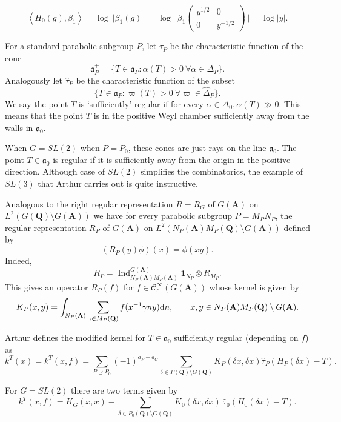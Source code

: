 \documentclass{ims9x6}
\def\apg{a_{P} - a_{G}}
\def\A{\mathbf A}
\def\Q{\mathbf Q}
\def\CCC{\mathcal C}
\def\aaa{\mathfrak a}
\def\d{\text d}
\def\bs{\setminus}
\def\Ind{\operatorname{Ind}}
\def\Ltwo{L^2}
\def\mod#1{\lvert #1 \rvert} %
\def\sprod#1#2{\left\langle #1 , #2 \right\rangle}  %
\begin{document}
\[ \sprod{H_0(g)}{\beta_1} = \log \ \mod{\beta_1(g)\ } = \log \ \mod{\beta_1 
			\begin{pmatrix} y^{1/2} & 0 \\ 0 & y^{-1/2} \end{pmatrix} \ } = \log \mod{y}. \]

For a standard parabolic subgroup $P$, let $\tau_P$ be the characteristic function of the cone 
\[ \aaa_P^+ = \{ T \in \aaa_P : \alpha(T) > 0 \ \forall \alpha \in \Delta_P \}. \]
Analogously let $\hat\tau_P$ be the characteristic function of the subset
\[ \{ T \in \aaa_P : \varpi(T) > 0 \ \forall \varpi \in \hat\Delta_P \}. \]
We say the point $T$ is `sufficiently' regular if for every $\alpha \in \Delta_0, \alpha(T) \gg 0$. This means that the point $T$ is in the positive Weyl chamber sufficiently away from the walls in $\aaa_0$. 

When $G = SL(2)$ when $P = P_0$, these cones are just rays on the line $\aaa_0$. The point $T \in \aaa_0$ is regular if it is sufficiently away from the origin in the positive direction. Although case of $SL(2)$ simplifies the combinatorics, the example of $SL(3)$ that Arthur carries out is quite instructive. 

Analogous to the right regular representation $R = R_G$ of $G(\A)$ on $\Ltwo(G(\Q) \bs G(\A))$ we have for every parabolic subgroup $P = M_P N_P$, the regular representation $R_P$ of $G(\A)$ on $\Ltwo(N_P(\A) M_P(\Q) \bs G(\A))$ defined by 
\[ (R_P(y)\phi)(x) = \phi(xy). \]
Indeed, 
\[ R_P = \Ind_{N_P(\A)M_P(\A)}^{G(\A)} \mathbf 1_{N_P} \otimes R_{M_P}. \]
This gives an operator $R_P(f)$ for $f \in \CCC_c^\infty(G(\A))$ whose kernel is given by
\[ K_P(x, y) = \int_{N_P(\A)} \sum_{\gamma \in M_P(\Q)} f(x^{-1} \gamma n y) \d n, \qquad 
		x, y \in N_P(\A)M_P(\Q)\bs G(\A). \]

Arthur defines the modified kernel for $T \in \aaa_0$ sufficiently regular (depending on $f$) as
\begin{equation} \label{kernel}
	k^T(x) = k^T(x, f) = \sum_{P \supseteq P_0} (-1)^{\apg} \sum_{\delta \in P(\Q) \bs G(\Q)}
		K_P(\delta x, \delta x) \hat\tau_P(H_P(\delta x) - T). 
\end{equation}


For $G = SL(2)$ there are two terms given by
\begin{equation} \label{k_sl2}
	k^T(x, f) = K_G(x, x) - \sum_{\delta \in P_0(\Q) \bs G(\Q)} K_0(\delta x, \delta x) \ \hat\tau_0(H_0(\delta x) - T).
\end{equation}
\end{document}
